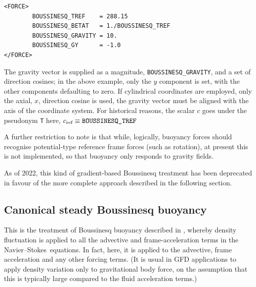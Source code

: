 \documentclass[11pt]{report}
\newcommand\NavSto{Navier--Stokes}
\begin{document}
\begin{verbatim}
<FORCE>
        BOUSSINESQ_TREF    = 288.15
        BOUSSINESQ_BETAT   = 1./BOUSSINESQ_TREF
        BOUSSINESQ_GRAVITY = 10.
        BOUSSINESQ_GY      = -1.0
</FORCE>
\end{verbatim}

The gravity vector is supplied as a magnitude,
\verb|BOUSSINESQ_GRAVITY|, and a set of direction cosines; in the
above example, only the $y$ component is set, with the other
components defaulting to zero.  If cylindrical coordinates are
employed, only the axial, $x$, direction cosine is used, \ie the
gravity vector must be aligned with the axis of the coordinate system.
For historical reasons, the scalar $c$ goes under the pseudonym
\verb|T| here, \ie $c_\textrm{ref}\equiv\verb|BOUSSINESQ_TREF|$

A further restriction to note is that while, logically, buoyancy
forces should recognise potential-type reference frame forces (such as
rotation), at present this is not implemented, so that buoyancy only
responds to gravity fields.

As of 2022, this kind of gradient-based Boussinesq treatment has been
deprecated in favour of the more complete approach described in the
following section.

\subsection{Canonical steady Boussinesq buoyancy}
\label{sec.csb}

This is the treatment of Boussinesq buoyancy described in
\citet{blss21}, whereby density fluctuation is applied to all the
advective and frame-acceleration terms in the \NavSto\ equations.  In
fact, here, it is applied to the advective, frame acceleration and any
other forcing terms.  (It is usual in GFD applications to apply
density variation only to gravitational body force, on the assumption
that this is typically large compared to the fluid acceleration
terms.)
\end{document}
